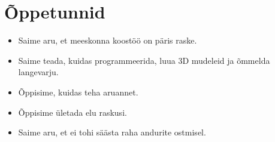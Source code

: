 \section{Õppetunnid}

\begin{itemize}
    \item Saime aru, et meeskonna koostöö on päris raske.
    \item Saime teada, kuidas programmeerida, luua 3D mudeleid ja õmmelda langevarju.
    \item Õppisime, kuidas teha aruannet.
    \item Õppisime ületada elu raskusi.
    \item Saime aru, et ei tohi säästa raha andurite ostmisel.
\end{itemize}